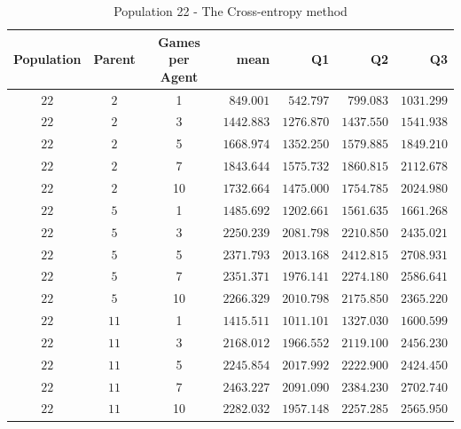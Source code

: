 \begin{table}[H]
\centering
\small
\begin{tabular}{c c c r r r r}
Population & Parent & Games per Agent & mean & Q1 & Q2 & Q3\\
\hline
$22$ & $2$ & 1 & $849.001$ & $542.797$ & $799.083$ & $1031.299$\\
$22$ & $2$ & 3 & $1442.883$ & $1276.870$ & $1437.550$ & $1541.938$\\
$22$ & $2$ & 5 & $1668.974$ & $1352.250$ & $1579.885$ & $1849.210$\\
\hdashline
$22$ & $2$ & 7 & $1843.644$ & $1575.732$ & $1860.815$ & $2112.678$\\
\hdashline
$22$ & $2$ & 10 & $1732.664$ & $1475.000$ & $1754.785$ & $2024.980$\\
$22$ & $5$ & 1 & $1485.692$ & $1202.661$ & $1561.635$ & $1661.268$\\
$22$ & $5$ & 3 & $2250.239$ & $2081.798$ & $2210.850$ & $2435.021$\\
\hdashline
$22$ & $5$ & 5 & $2371.793$ & $2013.168$ & $2412.815$ & $2708.931$\\
\hdashline
$22$ & $5$ & 7 & $2351.371$ & $1976.141$ & $2274.180$ & $2586.641$\\
$22$ & $5$ & 10 & $2266.329$ & $2010.798$ & $2175.850$ & $2365.220$\\
$22$ & $11$ & 1 & $1415.511$ & $1011.101$ & $1327.030$ & $1600.599$\\
$22$ & $11$ & 3 & $2168.012$ & $1966.552$ & $2119.100$ & $2456.230$\\
$22$ & $11$ & 5 & $2245.854$ & $2017.992$ & $2222.900$ & $2424.450$\\
\hdashline
$22$ & $11$ & 7 & $2463.227$ & $2091.090$ & $2384.230$ & $2702.740$\\
\hdashline
$22$ & $11$ & 10 & $2282.032$ & $1957.148$ & $2257.285$ & $2565.950$\\
\end{tabular}
\caption{Population 22 - The Cross-entropy method}
\end{table}


